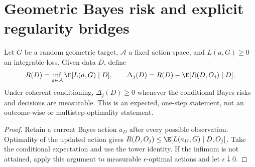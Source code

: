
\section{Geometric Bayes risk and explicit regularity bridges}

\begin{proposition}
\label{rthreegeo:coherence}
Let $G$ be a random geometric target, $\mathcal A$ a fixed action space,
and $L(a,G)\ge0$ an integrable loss. Given data $D$, define
\[
 R(D)=\inf_{a\in\mathcal A}\E[L(a,G)\mid D],\qquad
 \Delta_j(D)=R(D)-\E[R(D,O_j)\mid D].
\]
Under coherent conditioning, $\Delta_j(D)\ge0$ whenever the conditional
Bayes risks and decisions are measurable. This is an expected, one-step
statement, not an outcome-wise or multistep-optimality statement.
\end{proposition}
\begin{proof}
Retain a current Bayes action $a_D$ after every possible observation.
Optimality of the updated action gives
$R(D,O_j)\le\E[L(a_D,G)\mid D,O_j]$.
Take the conditional expectation and use the tower identity. If the
infimum is not attained, apply this argument to measurable
$\epsilon$-optimal actions and let $\epsilon\downarrow0$.
\end{proof}

